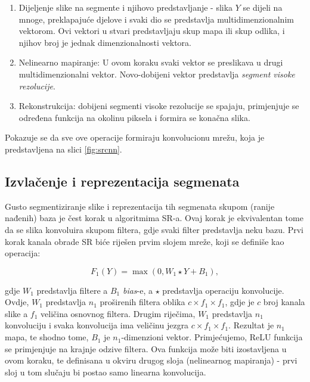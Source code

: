 \documentclass[12pt]{report}
\numberwithin{equation}{section}
\begin{document}
\begin{enumerate}

 \item Dijeljenje slike na segmente i njihovo predstavljanje - slika $Y$ se dijeli na mnoge, preklapajuće djelove i svaki dio se predstavlja multidimenzionalnim vektorom. Ovi vektori u stvari predstavljaju skup mapa ili skup odlika, i njihov broj je jednak dimenzionalnosti vektora. 
  
 \item Nelinearno mapiranje: U ovom koraku svaki vektor se preslikava u drugi multidimenzionalni vektor. Novo-dobijeni vektor predstavlja \textit{segment visoke rezolucije}.
  
 \item Rekonstrukcija: dobijeni segmenti visoke rezolucije se spajaju, primjenjuje se određena funkcija na okolinu piksela i formira se konačna slika. 

\end{enumerate}
Pokazuje se da sve ove operacije formiraju konvolucionu mrežu, koja je predstavljena na slici \ref{fig:srcnn}.


\subsection{Izvlačenje i reprezentacija segmenata}


Gusto segmentiziranje slike i reprezentacija tih segmenata skupom (ranije nađenih) baza je čest korak u algoritmima SR-a. Ovaj korak je ekvivalentan tome da se slika konvoluira skupom filtera, gdje svaki filter predstavlja neku bazu. Prvi korak kanala obrade SR biće riješen prvim slojem mreže, koji se definiše kao operacija:


\begin{equation}
  F_1(Y) = \max(0, W_1 \star Y + B_1),
\end{equation}

gdje $W_1$ predstavlja filtere a $B_1$ \textit{bias}-e, a $\star$ predstavlja operaciju konvolucije. Ovdje, $W_1$ predstavlja $n_1$ proširenih filtera oblika $c \times f_1 \times f_1$, gdje je $c$ broj kanala slike a $f_1$ veličina osnovnog filtera. Drugim riječima, $W_1$ predstavlja $n_1$ konvoluciju i svaka konvolucija ima veličinu jezgra $c \times f_1 \times f_1$. Rezultat je $n_1$ mapa, te shodno tome, $B_1$ je $n_1$-dimenzioni vektor. Primjećujemo, ReLU funkcija se primjenjuje na krajnje odzive filtera.  Ova funkcija može biti izostavljena u ovom koraku, te definisana u okviru drugog sloja (nelinearnog mapiranja) - prvi sloj u tom slučaju bi postao samo linearna konvolucija.
\end{document}
